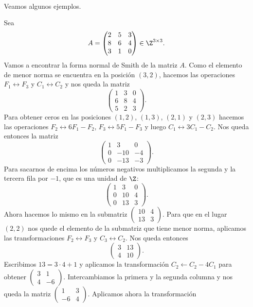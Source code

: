 Veamos algunos ejemplos. 

\begin{example}
Sea 
\[
A=\begin{pmatrix}
	2 & 5 & 3\\
	8 & 6 & 4\\
	3 & 1 & 0
\end{pmatrix}\in\Z^{3\times3}.
\]	
Vamos a encontrar la forma normal de Smith de la matriz $A$. Como el elemento de menor norma se encuentra en la posición $(3,2)$,
hacemos las operaciones $F_1\leftrightarrow F_3$ y $C_1\leftrightarrow C_2$ y nos queda la matriz
\[
\begin{pmatrix}
	1 & 3 & 0\\
	6 & 8 & 4\\
	5 & 2 & 3
\end{pmatrix}.
\]
Para obtener ceros en las posiciones $(1,2)$, $(1,3)$, $(2,1)$ y $(2,3)$ hacemos las operaciones
$F_2\leftrightarrow 6F_1-F_2$, $F_3\leftrightarrow 5F_1-F_3$ y luego 
$C_1\leftrightarrow 3C_1-C_2$. Nos queda entonces la matriz  
\[
\begin{pmatrix}
	1 & 3 & 0\\
	0 & -10 & -4\\
	0 & -13 & -3
\end{pmatrix}.
\]
Para sacarnos de encima los números negativos multiplicamos la segunda y la tercera fila por $-1$, que es una unidad de $\Z$:
\[
\begin{pmatrix}
	1 & 3 & 0\\
	0 & 10 & 4\\
	0 & 13 & 3
\end{pmatrix}.
\]
Ahora hacemos lo mismo en la submatriz $\begin{pmatrix}10&4\\13&3\end{pmatrix}$. Para que en el lugar $(2,2)$ nos
quede el elemento de la submatriz que tiene menor norma, aplicamos las transformaciones $F_2\leftrightarrow F_3$ y
$C_3\leftrightarrow C_2$. Nos queda entonces
\[ 
\begin{pmatrix}
3 & 13\\
4 & 10
\end{pmatrix}.
\]
Escribimos $13=3\cdot 4+1$ y aplicamos
la transformación $C_2\leftarrow C_2-4C_1$ para obtener $\begin{pmatrix}3&1\\4&-6\end{pmatrix}$. Intercambiamos 
la primera y la segunda columna y nos queda la matriz
$\begin{pmatrix}1&3\\-6&4\end{pmatrix}$. Aplicamos ahora la transformación

\end{example}
